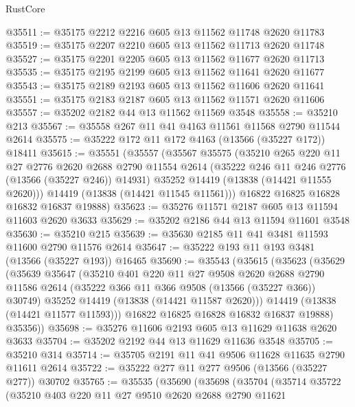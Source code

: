 \begin{lexlean}{RustCore}
\begin{coremodule}
@35511 := @35175 @2212 @2216 @605 @13 @11562 @11748 @2620 @11783
@35519 := @35175 @2207 @2210 @605 @13 @11562 @11713 @2620 @11748
@35527 := @35175 @2201 @2205 @605 @13 @11562 @11677 @2620 @11713
@35535 := @35175 @2195 @2199 @605 @13 @11562 @11641 @2620 @11677
@35543 := @35175 @2189 @2193 @605 @13 @11562 @11606 @2620 @11641
@35551 := @35175 @2183 @2187 @605 @13 @11562 @11571 @2620 @11606
@35557 := @35202 @2182 @44 @13 @11562 @11569 @3548
@35558 := @35210 @213
@35567 := @35558 @267 @11 @41 @4163 @11561 @11568 @2790 @11544 @2614
@35575 := @35222 @172 @11 @172 @4163 (@13566 (@35227 @172)) @18411
@35615 := @35551
    (@35557
      (@35567
        @35575
        (@35210
          @265
          @220
          @11
          @27
          @2776
          @2620
          @2688
          @2790
          @11554
          @2614
          (@35222 @246 @11 @246 @2776 (@13566 (@35227 @246)) @14931)
          @35252
          @14419
          (@13838 (@14421 @11555 @2620)))
        @14419
        (@13838 (@14421 @11545 @11561)))
      @16822
      @16825
      @16828
      @16832
      @16837
      @19888)
@35623 := @35276 @11571 @2187 @605 @13 @11594 @11603 @2620 @3633
@35629 := @35202 @2186 @44 @13 @11594 @11601 @3548
@35630 := @35210 @215
@35639 := @35630 @2185 @11 @41 @3481 @11593 @11600 @2790 @11576 @2614
@35647 := @35222 @193 @11 @193 @3481 (@13566 (@35227 @193)) @16465
@35690 := @35543
    (@35615
      (@35623
        (@35629
          (@35639
            @35647
            (@35210
              @401
              @220
              @11
              @27
              @9508
              @2620
              @2688
              @2790
              @11586
              @2614
              (@35222 @366 @11 @366 @9508 (@13566 (@35227 @366)) @30749)
              @35252
              @14419
              (@13838 (@14421 @11587 @2620)))
            @14419
            (@13838 (@14421 @11577 @11593)))
          @16822
          @16825
          @16828
          @16832
          @16837
          @19888)
        @35356))
@35698 := @35276 @11606 @2193 @605 @13 @11629 @11638 @2620 @3633
@35704 := @35202 @2192 @44 @13 @11629 @11636 @3548
@35705 := @35210 @314
@35714 := @35705 @2191 @11 @41 @9506 @11628 @11635 @2790 @11611 @2614
@35722 := @35222 @277 @11 @277 @9506 (@13566 (@35227 @277)) @30702
@35765 := @35535
    (@35690
      (@35698
        (@35704
          (@35714
            @35722
            (@35210
              @403
              @220
              @11
              @27
              @9510
              @2620
              @2688
              @2790
              @11621

\end{coremodule}
\end{lexlean}
